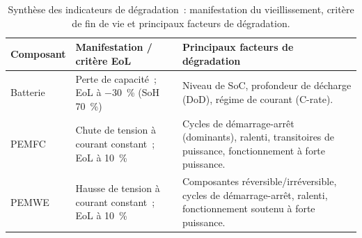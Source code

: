 \begin{table}[h!]
\centering
\caption{Synthèse des indicateurs de dégradation~: manifestation du vieillissement, critère de fin de vie et principaux facteurs de dégradation.}
\label{tab:synthese_degradation}
\footnotesize
\renewcommand{\arraystretch}{1.25}
\begin{tabularx}{\textwidth}{p{2.1cm} p{3.5cm} X}
\hline
\textbf{Composant} & \textbf{Manifestation / critère EoL} & \textbf{Principaux facteurs de dégradation} \\ \hline
Batterie & Perte de capacité~; EoL à \SI{-30}{\percent} (SoH \SI{70}{\percent}) & Niveau de SoC, profondeur de décharge (DoD), régime de courant (C-rate). \\
PEMFC & Chute de tension à courant constant~; EoL à \SI{+10}{\percent} & Cycles de démarrage-arrêt (dominants), ralenti, transitoires de puissance, fonctionnement à forte puissance. \\
PEMWE & Hausse de tension à courant constant~; EoL à \SI{+10}{\percent} & Composantes réversible/irréversible, cycles de démarrage-arrêt, ralenti, fonctionnement soutenu à forte puissance. \\ \hline
\end{tabularx}
\end{table}
\FloatBarrier